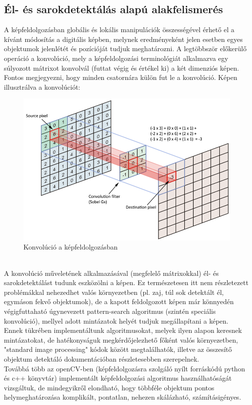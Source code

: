 \documentclass{article}
\begin{document}
 \subsection{Él- és sarokdetektálás alapú alakfelismerés}
A képfeldolgozásban globális és lokális manipulációk összességével érhető el a kívánt módosítás 
a digitális képben, melynek eredményeként jelen esetben egyes objektumok jelenlétét és pozícióját tudjuk 
meghatározni. A legtöbbször előkerülő operáció a konvolúció, mely a képfeldolgozási terminológiát 
alkalmazva egy súlyozott mátrixot konvolvál (futtat végig és értékel ki) a két dimenziós képen.
Fontos megjegyezni, hogy minden csatornára külön fut le a konvolúció. Képen illusztrálva a konvolúciót:
\begin{figure}[h]
    \centering
    \includegraphics[scale=0.5]{konvolucio.png}
    \caption{Konvolúció a képfeldolgozásban}
\end{figure}\\
A konvolúció műveletének alkalmazásával (megfelelő mátrixokkal) él- és sarokdetektálást tudunk 
eszközölni a képen. Ez természetesen itt nem részletezett problémákkal nehezedhet valós környezetben
(pl. zaj, túl sok detektált él, egymáson fekvő objektumok), de a kapott feldolgozott képen már 
könnyedén végigfuttaható úgynevezett pattern-search algoritmus (szintén speciális konvolúció), mellyel 
adott mintázatok helyét tudjuk megállapítani a képen.\\[5pt]
Ennek tükrében implementáltunk algoritmusokat, melyek ilyen alapon keresnek mintázatokat, de
hatékonyságuk megkérdőjelezhető főként valós környezetben, "standard image processing" kódok között 
megtalálhatók, illetve az összesítő objektum detektáló dokumentációban részletesebben szerepelnek.\\[5pt]
Továbbá több az openCV-ben (képfeldolgozásra szolgáló nyílt forráskódú python és c++ könyvtár) 
implementált képfeldolgozási algoritmus használhatóságát vizsgáltuk, de mindegyikről elondható, hogy 
többféle objektum pontos helymeghatározása komplikált, pontatlan, nehezen skálázható, számításigényes.
\end{document}
